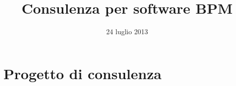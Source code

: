 \documentclass[compress,9pt]{beamer}
\title{Consulenza per software BPM}
\author{\team}
\date{24 luglio 2013}
\begin{document}
\begin{frame}
\maketitle
\end{frame}

\begin{frame}
\begin{multicols}{2}
\tableofcontents
\newpage
\begin{figure}
\setlength{\fboxsep}{.2pt}
\end{figure}
\end{multicols}
\end{frame}

\section{Progetto di consulenza}
\end{document}
